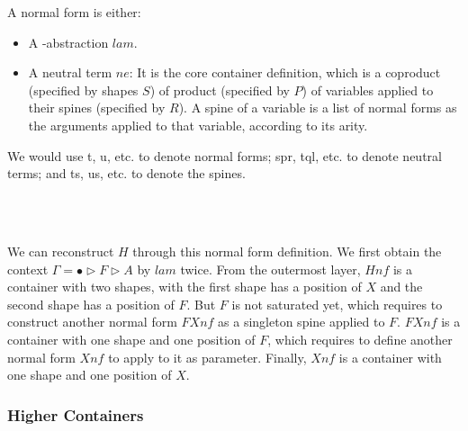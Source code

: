 A normal form is either:

\begin{itemize}
  \item{A \lambda-abstraction $lam$.}
  \item{A neutral term $ne$: It is the core container definition, which is a coproduct (specified by shapes $S$) of product (specified by $P$) of variables applied to their spines (specified by $R$). A spine of a variable is a list of normal forms as the arguments applied to that variable, according to its arity.}
\end{itemize}

We would use t, u, etc. to denote normal forms; spr, tql, etc. to denote neutral terms; and ts, us, etc. to denote the spines.

\begin{code}[hide]%
\>[0]\AgdaSpace{}%
\AgdaSpace{}%
\AgdaSpace{}%
\AgdaSpace{}%
\AgdaSymbol{:}\AgdaSpace{}%
\AgdaSpace{}%
\AgdaSpace{}%
\<%
\\
\>[0]\AgdaSpace{}%
\AgdaSpace{}%
\AgdaSpace{}%
\AgdaSymbol{:}\AgdaSpace{}%
\AgdaSpace{}%
\AgdaSpace{}%
\<%
\\
\>[0]\AgdaSpace{}%
\AgdaSpace{}%
\AgdaSpace{}%
\AgdaSpace{}%
\AgdaSymbol{:}\AgdaSpace{}%
\AgdaSpace{}%
\AgdaSpace{}%
\AgdaSpace{}%
\<%
\end{code}

We can reconstruct $H$ through this normal form definition. We first obtain the context $\Gamma = \bullet \triangleright F \triangleright A$ by $lam$ twice. From the outermost layer, $Hnf$ is a container with two shapes, with the first shape has a position of $X$ and the second shape has a position of $F$. But $F$ is not saturated yet, which requires to construct another normal form $FXnf$ as a singleton spine applied to $F$. $FXnf$ is a container with one shape and one position of $F$, which requires to define another normal form $Xnf$ to apply to it as parameter. Finally, $Xnf$ is a container with one shape and one position of $X$. \hyperref[Hnf]{\faCog}

\subsubsection{Higher Containers}

